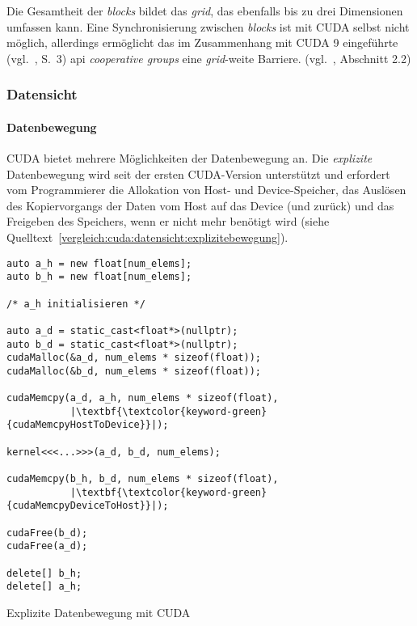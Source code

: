 Die Gesamtheit der \textit{blocks} bildet das \textit{grid}, das ebenfalls bis
zu drei Dimensionen umfassen kann. Eine Synchronisierung zwischen
\textit{blocks} ist mit CUDA selbst nicht möglich, allerdings ermöglicht
das im Zusammenhang mit CUDA 9 eingeführte (vgl.~\cite{cuda2018}, S.\ 3)
\gls{api} \textit{cooperative groups} eine \textit{grid}-weite Barriere.
(vgl.~\cite{cudaguide}, Abschnitt 2.2)

\subsubsection{Datensicht}
\label{vergleich:cuda:datensicht}

\paragraph{Datenbewegung}

CUDA bietet mehrere Möglichkeiten der Datenbewegung an. Die \textit{explizite}
Datenbewegung wird seit der ersten CUDA-Version unterstützt und erfordert vom
Programmierer die Allokation von Host- und Device-Speicher, das Auslösen des
Kopiervorgangs der Daten vom Host auf das Device (und zurück) und das Freigeben
des Speichers, wenn er nicht mehr benötigt wird (siehe
Quelltext~\ref{vergleich:cuda:datensicht:explizitebewegung}).

\begin{code}
    \begin{verbatim}
auto a_h = new float[num_elems];
auto b_h = new float[num_elems];

/* a_h initialisieren */

auto a_d = static_cast<float*>(nullptr);
auto b_d = static_cast<float*>(nullptr);
cudaMalloc(&a_d, num_elems * sizeof(float));
cudaMalloc(&b_d, num_elems * sizeof(float));

cudaMemcpy(a_d, a_h, num_elems * sizeof(float),
           |\textbf{\textcolor{keyword-green}{cudaMemcpyHostToDevice}}|);

kernel<<<...>>>(a_d, b_d, num_elems);

cudaMemcpy(b_h, b_d, num_elems * sizeof(float),
           |\textbf{\textcolor{keyword-green}{cudaMemcpyDeviceToHost}}|);

cudaFree(b_d);
cudaFree(a_d);

delete[] b_h;
delete[] a_h;
    \end{verbatim}
    \caption{Explizite Datenbewegung mit CUDA}
    \label{vergleich:cuda:datensicht:explizitebewegung}
\end{code}

